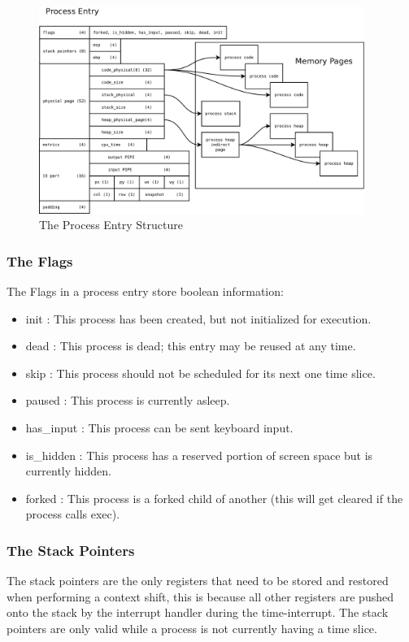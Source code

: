 \documentclass[a4paper]{report}
\begin{document}
\begin{figure}[ht]
\centering
\includegraphics[width=400px]{images/Process_Entry_Structure}
\caption{The Process Entry Structure}
\label{fig:WinTitleBarScreen}
\end{figure}

\subsubsection{The Flags}

The Flags in a process entry store boolean information:
\begin{itemize}
\item init : This process has been created, but not initialized for execution.
\item dead : This process is dead; this entry may be reused at any time.
\item skip : This process should not be scheduled for its next one time slice.
\item paused : This process is currently asleep.
\item has\_input : This process can be sent keyboard input.
\item is\_hidden : This process has a reserved portion of screen space but is currently hidden.
\item forked : This process is a forked child of another (this will get cleared if the process calls exec).
\end{itemize}

\subsubsection{The Stack Pointers}
The stack pointers are the only registers that need to be stored and restored when performing a context shift, this is because all other registers are pushed onto the stack by the interrupt handler during the time-interrupt. The stack pointers are only valid while a process is not currently having a time slice.
\end{document}
